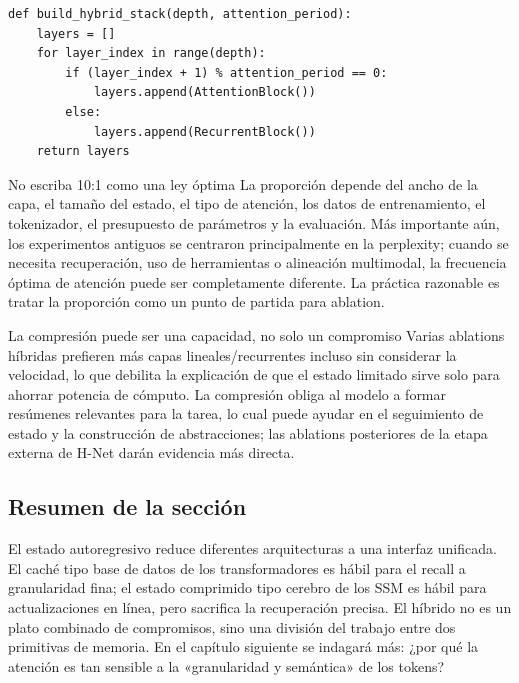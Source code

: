 \documentclass[a4paper]{article}
\begin{document}
\begin{lstlisting}[caption={Pseudocódigo didáctico de un pila híbrida con atención insertada periódicamente}]
def build_hybrid_stack(depth, attention_period):
    layers = []
    for layer_index in range(depth):
        if (layer_index + 1) % attention_period == 0:
            layers.append(AttentionBlock())
        else:
            layers.append(RecurrentBlock())
    return layers
\end{lstlisting}


\begin{warningbox}{No escriba 10:1 como una ley óptima}
La proporción depende del ancho de la capa, el tamaño del estado, el tipo de atención, los datos de entrenamiento, el tokenizador, el presupuesto de parámetros y la evaluación. Más importante aún, los experimentos antiguos se centraron principalmente en la perplexity; cuando se necesita recuperación, uso de herramientas o alineación multimodal, la frecuencia óptima de atención puede ser completamente diferente. La práctica razonable es tratar la proporción como un punto de partida para ablation.
\end{warningbox}

\begin{importantbox}{La compresión puede ser una capacidad, no solo un compromiso}
Varias ablations híbridas prefieren más capas lineales/recurrentes incluso sin considerar la velocidad, lo que debilita la explicación de que el estado limitado sirve solo para ahorrar potencia de cómputo. La compresión obliga al modelo a formar resúmenes relevantes para la tarea, lo cual puede ayudar en el seguimiento de estado y la construcción de abstracciones; las ablations posteriores de la etapa externa de H-Net darán evidencia más directa.
\end{importantbox}

\subsection{Resumen de la sección}

El estado autoregresivo reduce diferentes arquitecturas a una interfaz unificada. El caché tipo base de datos de los transformadores es hábil para el recall a granularidad fina; el estado comprimido tipo cerebro de los SSM es hábil para actualizaciones en línea, pero sacrifica la recuperación precisa. El híbrido no es un plato combinado de compromisos, sino una división del trabajo entre dos primitivas de memoria. En el capítulo siguiente se indagará más: ¿por qué la atención es tan sensible a la «granularidad y semántica» de los tokens?
\end{document}
